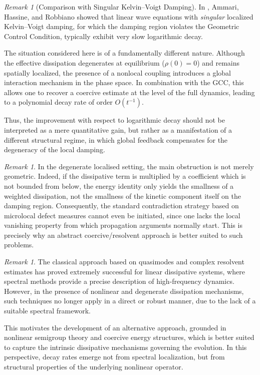 \documentclass[11pt,reqno]{amsart}
\theoremstyle{remark}
\newtheorem{remark}[theorem]{Remark}
\begin{document}
\begin{remark}[Comparison with Singular Kelvin--Voigt Damping]
In \cite{Ammari2020}, Ammari, Hassine, and Robbiano showed that linear wave equations
with \emph{singular} localized Kelvin--Voigt damping, for which the damping region
violates the Geometric Control Condition, typically exhibit very slow logarithmic decay.

The situation considered here is of a fundamentally different nature.
Although the effective dissipation degenerates at equilibrium ($\rho(0)=0$)
and remains spatially localized, the presence of a nonlocal coupling introduces
a global interaction mechanism in the phase space. In combination with the GCC,
this allows one to recover a coercive estimate at the level of the full dynamics,
leading to a polynomial decay rate of order $O(t^{-1})$.

Thus, the improvement with respect to logarithmic decay should not be interpreted
as a mere quantitative gain, but rather as a manifestation of a different structural
regime, in which global feedback compensates for the degeneracy of the local damping.
\end{remark}

\begin{remark}
In the degenerate localised setting, the main obstruction is not merely geometric.
Indeed, if the dissipative term is multiplied by a coefficient which is not bounded from below,
the energy identity only yields the smallness of a weighted dissipation, not the smallness of
the kinetic component itself on the damping region. Consequently, the standard contradiction
strategy based on microlocal defect measures cannot even be initiated, since one lacks the
local vanishing property from which propagation arguments normally start. This is precisely
why an abstract coercive/resolvent approach is better suited to such problems.
\end{remark}

\begin{remark}
The classical approach based on quasimodes and complex resolvent estimates
has proved extremely successful for linear dissipative systems, where spectral
methods provide a precise description of high-frequency dynamics.
However, in the presence of nonlinear and degenerate dissipation mechanisms,
such techniques no longer apply in a direct or robust manner, due to the lack
of a suitable spectral framework.

This motivates the development of an alternative approach, grounded in nonlinear
semigroup theory and coercive energy structures, which is better suited to capture
the intrinsic dissipative mechanisms governing the evolution. In this perspective,
decay rates emerge not from spectral localization, but from structural properties
of the underlying nonlinear operator.
\end{remark}
\end{document}

